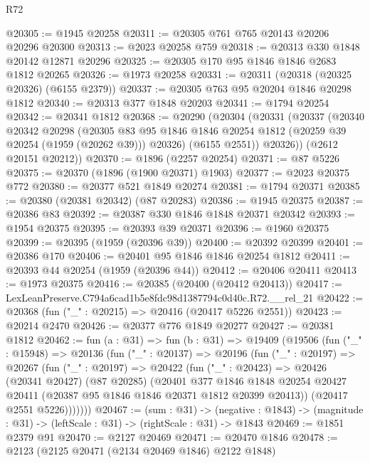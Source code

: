 \begin{lexlean}{R72}
\begin{coremodule}
@20305 := @1945 @20258
@20311 := @20305 @761 @765 @20143 @20206 @20296 @20300
@20313 := @2023 @20258 @759
@20318 := @20313 @330 @1848 @20142 @12871 @20296
@20325 := @20305 @170 @95 @1846 @1846 @2683 @1812 @20265
@20326 := @1973 @20258
@20331 := @20311 (@20318 (@20325 @20326) (@6155 @2379))
@20337 := @20305 @763 @95 @20204 @1846 @20298 @1812
@20340 := @20313 @377 @1848 @20203
@20341 := @1794 @20254
@20342 := @20341 @1812
@20368 := @20290
    (@20304
      (@20331
        (@20337
          (@20340
            @20342
            @20298
            (@20305
              @83
              @95
              @1846
              @1846
              @20254
              @1812
              (@20259 @39 @20254 (@1959 (@20262 @39)))
              @20326)
            (@6155 @2551))
          @20326))
      (@2612 @20151 @20212))
@20370 := @1896 (@2257 @20254)
@20371 := @87 @5226
@20375 := @20370 (@1896 (@1900 @20371) @1903)
@20377 := @2023 @20375 @772
@20380 := @20377 @521 @1849 @20274
@20381 := @1794 @20371
@20385 := @20380 (@20381 @20342) (@87 @20283)
@20386 := @1945 @20375
@20387 := @20386 @83
@20392 := @20387 @330 @1846 @1848 @20371 @20342
@20393 := @1954 @20375
@20395 := @20393 @39 @20371
@20396 := @1960 @20375
@20399 := @20395 (@1959 (@20396 @39))
@20400 := @20392 @20399
@20401 := @20386 @170
@20406 := @20401 @95 @1846 @1846 @20254 @1812
@20411 := @20393 @44 @20254 (@1959 (@20396 @44))
@20412 := @20406 @20411
@20413 := @1973 @20375
@20416 := @20385 (@20400 (@20412 @20413))
@20417 := LexLeanPreserve.C794a6cad1b5e8fdc98d1387794c0d40c.R72.__rel_21
@20422 := @20368 (fun ("_" : @20215) => @20416 (@20417 @5226 @2551))
@20423 := @20214 @2470
@20426 := @20377 @776 @1849 @20277
@20427 := @20381 @1812
@20462 := fun (a : @31) =>
  fun (b : @31) =>
  @19409
    (@19506
      (fun ("_" : @15948) =>
      @20136
        (fun ("_" : @20137) =>
        @20196
          (fun ("_" : @20197) =>
          @20267
            (fun ("_" : @20197) =>
            @20422
              (fun ("_" : @20423) =>
              @20426
                (@20341 @20427)
                (@87 @20285)
                (@20401
                  @377
                  @1846
                  @1848
                  @20254
                  @20427
                  @20411
                  (@20387 @95 @1846 @1846 @20371 @1812 @20399 @20413))
                (@20417 @2551 @5226)))))))
@20467 := (sum : @31) ->
  (negative : @1843) -> (magnitude : @31) -> (leftScale : @31) -> (rightScale : @31) -> @1843
@20469 := @1851 @2379 @91
@20470 := @2127 @20469
@20471 := @20470 @1846
@20478 := @2123 (@2125 @20471 (@2134 @20469 @1846) @2122 @1848)

\end{coremodule}
\end{lexlean}
